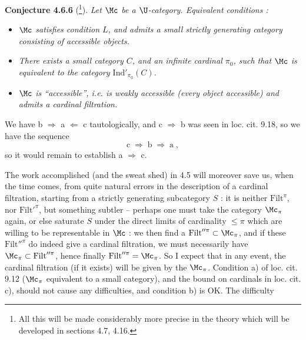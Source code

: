 \textbf{Conjecture 4.6.6} (\footnote[61]{All this will be made considerably more precise in the theory which will be developed in sections 4.7, 4.16.}). \textit{Let $\Mc$ be a $\U$-category. Equivalent conditions :} %
\begin{itemize}[leftmargin=4em]
\item[\textit{a)}] \textit{$\Mc$ satisfies condition $L$, and admits a small strictly generating category consisting of accessible objects.}
\item[\llap{$\Uparrow$\ }\textit{b)}] \textit{There exists a small category $C$, and an infinite cardinal $\pi_0$, such that $\Mc$ is equivalent to the category $\mathrm{Ind}'_{\pi_0}(C)$.}
\item[\llap{$\Uparrow$\ }\textit{c)}] \textit{$\Mc$ is ``accessible'', i.e. is weakly accessible (every object accessible) and admits a cardinal filtration.}
\end{itemize}
We have b $\Longrightarrow$ a $\Longleftarrow$ c tautologically, and c $\Longrightarrow$ b was seen in loc. cit. 9.18, so we have the sequence
\[
\mathrm{c} \;\Longrightarrow\; \mathrm{b} \;\Longrightarrow\; \mathrm{a}\;,
\]
so it would remain to establish a $\Longrightarrow$ c.


The work accomplished (and the sweat shed) in 4.5 will moreover save us, when the time comes, from quite natural errors in the description of a cardinal filtration, starting from a strictly generating subcategory $S$ : it is neither $\mathrm{Filt}^{\pi}$, nor $\mathrm{Filt}'^{\pi}$, but something subtler -- perhaps one must take the category $\Mc_{\pi}$ again, or else saturate $S$ under the direct limits of cardinality $\leqslant \pi$ which are willing to be representable in $\Mc$ : we then find a $\mathrm{Filt}''^{\pi} \subset \Mc_{\pi}$, and if these $\mathrm{Filt}''^{\pi}$ do indeed give a cardinal filtration, we must necessarily have $\Mc_{\pi} \subset \mathrm{Filt}''^{\pi}$, hence finally $\mathrm{Filt}''^{\pi} = \Mc_{\pi}$. So I expect that in any event, the cardinal filtration (if it exists) will be given by the $\Mc_{\pi}$. Condition a) of loc. cit. 9.12 ($\Mc_{\pi}$ equivalent to a small category), and the bound on cardinals in loc. cit. c), should not cause any difficulties, and condition b) is OK. The difficulty


